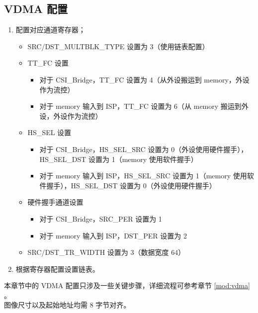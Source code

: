 \documentclass[main\_\_CN.tex]{subfiles}
\begin{document}
\subsection{VDMA 配置}
\label{sec:isp_vdma_proc}
\begin{enumerate}
    \item 配置对应通道寄存器；
    \begin{itemize}
        \item SRC/DST\_MULTBLK\_TYPE 设置为 3（使用链表配置）
        \item TT\_FC 设置
        \begin{itemize}
            \item 对于 CSI\_Bridge，TT\_FC 设置为 4（从外设搬运到 memory，外设作为流控）
            \item 对于 memory 输入到 ISP，TT\_FC 设置为 6（从 memory 搬运到外设，外设作为流控）
        \end{itemize}
        \item HS\_SEL 设置
        \begin{itemize}
            \item 对于 CSI\_Bridge，HS\_SEL\_SRC 设置为 0（外设使用硬件握手），HS\_SEL\_DST 设置为 1（memory 使用软件握手）
            \item 对于 memory 输入到 ISP，HS\_SEL\_SRC 设置为 1（memory 使用软件握手），HS\_SEL\_DST 设置为 0（外设使用硬件握手）
        \end{itemize}
        \item 硬件握手通道设置
        \begin{itemize}
            \item 对于 CSI\_Bridge，SRC\_PER 设置为 1
            \item 对于 memory 输入到 ISP，DST\_PER 设置为 2
        \end{itemize}
        \item SRC/DST\_TR\_WIDTH 设置为 3（数据宽度 64）
    \end{itemize}

    \item 根据寄存器配置设置链表。
\end{enumerate}

\begin{tiplisting}
    本章节中的 VDMA 配置只涉及一些关键步骤，详细流程可参考章节 \ref{mod:vdma} \textit{}。\\
    图像尺寸以及起始地址均需 8 字节对齐。
\end{tiplisting}
\end{document}
